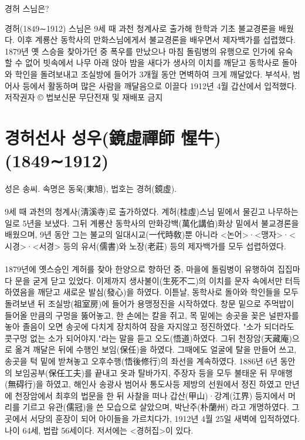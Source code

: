 \documentclass[12pt, a4paper, oneside]{book}
\let\stdsection\section
\renewcommand\section{\newpage\stdsection}
\begin{document}
경허 스님은?

경허(1849∼1912) 스님은 9세 때 과천 청계사로 출가해 한학과 기초 불교경론을 배웠다. 이후 계룡산 동학사의 만화스님에게서 불교경론을 배우면서 제자백가를 섭렵했다. 1879년 옛 스승을 찾아가던 중 폭우를 만났으나 마침 돌림병의 유행으로 인가에 유숙할 수 없어 빗속에서 나무 아래 앉아 밤을 새다가 생사의 이치를 깨닫고 동학사로 돌아와 학인을 돌려보내고 조실방에 들어가 3개월 동안 면벽하여 크게 깨달았다. 부석사, 범어사 등에서 활동하며 많은 사람을 깨달음으로 이끌다 1912년 4월 갑산에서 입적했다.
저작권자 © 법보신문 무단전재 및 재배포 금지

%										
	\section{ 경허선사 성우(鏡虛禪師 惺牛) (1849∼1912) }

성은 송씨. 속명은 동욱(東旭), 법호는 경허(鏡虛).
\paragraph{}
9세 때 과천의 청계사(淸溪寺)로 출가하였다. 계허(桂虛)스님 밑에서 물긷고 나무하는 일로 5년을 보냈다. 그뒤 계룡산 동학사의 만화강백(萬化講伯)화상 밑에서 불교경론을 배웠으며, 9년 동안 그는 불교의 일대시교(一代時敎)뿐 아니라 <논어>·<맹자>·<시경>·<서경> 등의 유서(儒書)와 노장(老莊) 등의 제자백가를 모두 섭렵하였다.
\paragraph{}
1879년에 옛스승인 계허를 찾아 한양으로 향하던 중, 마을에 돌림병이 유행하여 집집마다 문을 굳게 닫고 있었다. 이제까지 생사불이(生死不二)의 이치를 문자 속에서만 터득하였음을 깨닫고 새로운 발심(發心)을 하였다. 이튿날, 동학사로 돌아와 학인들을 모두 돌려보낸 뒤 조실방(祖室房)에 들어가 용맹정진을 시작하였다. 창문 밑으로 주먹밥이 들어올 만큼의 구멍을 뚫어놓고, 한 손에는 칼을 쥐고, 목 밑에는 송곳을 꽂은 널판자를 놓아 졸음이 오면 송곳에 다치게 장치하여 잠을 자지않고 정진하였다. "소가 되더라도 콧구멍 없는 소가 되어야지."라는 말을 듣고 오도(悟道)하였다. 그뒤 천장암(天藏庵)으로 옮겨 깨달은 뒤에 수행인 보임(保任)을 하였다. 그때에도 얼굴에 탈을 만들어 쓰고, 송곳을 턱 밑에 받쳐놓고 오후수행(悟後修行)의 좌선을 계속하였다. 1886년 6년 동안의 보임공부(保任工夫)를 끝내고 옷과 탈바가지, 주장자 등을 모두 불태운 뒤 무애행(無碍行)을 하였고, 해인사 송광사 범어사 통도사등 제방의 선원에서 정진 하였고 만년에 천장암에서 최후의 법문을 한 뒤 사찰을 떠나 갑산(甲山)·강계(江界) 등지에서 머리를 기르고 유관(儒冠)을 쓴 모습으로 살았으며, 박난주(朴蘭州) 라고 개명하였다. 그곳에서 서당의 훈장이 되어 아이들을 가르치다가, 1912년 4월 25일 새벽에 입적하였다. 나이 64세, 법랍 56세이다. 저서에는 <경허집>이 있다.
\end{document}
